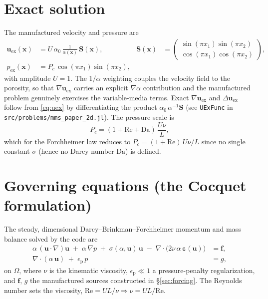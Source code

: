 \documentclass[11pt]{article}
\newcommand{\uu}{\bm{u}}
\newcommand{\xx}{\bm{x}}
\newcommand{\ff}{\bm{f}}
\newcommand{\grad}{\nabla}
\newcommand{\dive}{\grad\!\cdot\!}
\newcommand{\eps}{\bm{\varepsilon}}
\begin{document}
\section{Exact solution}

The manufactured velocity and pressure are
\begin{align}
\uu_{\mathrm{ex}}(\xx)
  &= U\,\alpha_0\,\frac{1}{\alpha(\xx)}\,\bm S(\xx),
  &\bm S(\xx)&=\begin{pmatrix}\sin(\pi x_1)\sin(\pi x_2)\\[2pt]
                              \cos(\pi x_1)\cos(\pi x_2)\end{pmatrix},
  \label{eq:uex}\\[4pt]
p_{\mathrm{ex}}(\xx) &= P_c\,\cos(\pi x_1)\sin(\pi x_2),
  \label{eq:pex}
\end{align}
with amplitude $U=1$. The $1/\alpha$ weighting couples the velocity field to
the porosity, so that $\grad\uu_{\mathrm{ex}}$ carries an explicit
$\grad\alpha$ contribution and the manufactured problem genuinely exercises the
variable-media terms. Exact $\grad\uu_{\mathrm{ex}}$ and
$\Delta\uu_{\mathrm{ex}}$ follow from \eqref{eq:uex} by differentiating the
product $\alpha_0\,\alpha^{-1}\bm S$ (see \texttt{UExFunc} in
\texttt{src/problems/mms\_paper\_2d.jl}). The pressure scale is
\begin{equation}
P_c=(1+\mathrm{Re}+\mathrm{Da})\,\frac{U\nu}{L},
\end{equation}
which for the Forchheimer law reduces to $P_c=(1+\mathrm{Re})\,U\nu/L$ since no
single constant $\sigma$ (hence no Darcy number $\mathrm{Da}$) is defined.

\section{Governing equations (the Cocquet formulation)}

The steady, dimensional Darcy--Brinkman--Forchheimer momentum and mass balance
solved by the code are
\begin{align}
\alpha\,(\uu\!\cdot\!\grad)\uu
  \;+\;\alpha\,\grad p
  \;+\;\sigma(\alpha,\uu)\,\uu
  \;-\;\dive\!\big(2\nu\,\alpha\,\eps(\uu)\big)
  &= \ff,
  \label{eq:mom}\\[4pt]
\dive(\alpha\,\uu)\;+\;\epsilon_{\mathrm p}\,p &= g,
  \label{eq:mass}
\end{align}
on $\Omega$, where $\nu$ is the kinematic viscosity, $\epsilon_{\mathrm p}\ll1$
a pressure-penalty regularization, and $\ff$, $g$ the manufactured sources
constructed in \S\ref{sec:forcing}. The Reynolds number sets the viscosity,
$\mathrm{Re}=UL/\nu \Rightarrow \nu=UL/\mathrm{Re}$.
\end{document}
